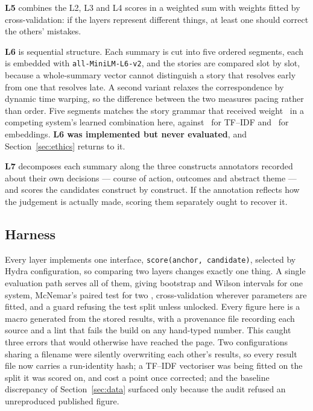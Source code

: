 \documentclass[11pt,letterpaper,twocolumn]{article}
\begin{document}
\textbf{L5} combines the L2, L3 and L4 scores in a weighted sum with weights
fitted by cross-validation: if the layers represent different things, at least
one should correct the others' mistakes.

\textbf{L6} is sequential structure. Each summary is cut into five ordered
segments, each is embedded with \texttt{all-MiniLM-L6-v2}, and the stories are
compared slot by slot, because a whole-summary vector cannot distinguish a
story that resolves early from one that resolves late. A second variant relaxes
the correspondence by dynamic time warping, so the difference between the two
measures pacing rather than order. Five segments matches the story grammar that
received weight \GrammarWeight\ in a competing system's learned combination
here, against \TfidfWeight\ for TF--IDF and \EmbedWeight\ for embeddings.
\textbf{L6 was implemented but never evaluated}, and
Section~\ref{sec:ethics} returns to it.

\textbf{L7} decomposes each summary along the three constructs annotators
recorded about their own decisions --- course of action, outcomes and abstract
theme --- and scores the candidates construct by construct. If the annotation
reflects how the judgement is actually made, scoring them separately ought to
recover it.

\subsection{Harness}
Every layer implements one interface, \texttt{score(anchor, candidate)},
selected by Hydra configuration, so comparing two layers changes exactly one
thing. A single evaluation path serves all of them, giving bootstrap and Wilson
intervals for one system, McNemar's paired test for two \citep{dietterich},
cross-validation wherever parameters are fitted, and a guard refusing the test
split unless unlocked. Every figure here is a macro generated from the stored
results, with a provenance file recording each source and a lint that fails the
build on any hand-typed number. This caught three errors that would otherwise have reached the page. Two
configurations sharing a filename were silently overwriting each other's
results, so every result file now carries a run-identity hash; a
TF--IDF vectoriser was being fitted on the split it was scored on, and cost a
point once corrected; and the baseline discrepancy of Section~\ref{sec:data}
surfaced only because the audit refused an unreproduced published figure.


\end{document}
